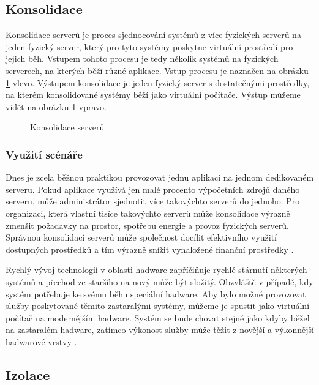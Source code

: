 \subsection{Konsolidace}
\label{consolidation}

Konsolidace serverů je proces sjednocování systémů z více fyzických serverů na jeden fyzický server, který pro tyto systémy poskytne virtuální prostředí pro jejich běh. Vstupem tohoto procesu je tedy několik systémů na fyzických serverech,
na kterých běží různé aplikace. Vstup procesu je naznačen na obrázku \ref{consolidation_img} vlevo. Výstupem konsolidace je jeden fyzický server s dostatečnými prostředky, na kterém konsolidované systémy běží jako virtuální počítače.
Výstup můžeme vidět na obrázku \ref{consolidation_img} vpravo.

\begin{figure}
    \centering    
    \caption{Konsolidace serverů}
    \label{consolidation_img}
\end{figure}

\subsubsection*{Využití scénáře}

Dnes je zcela běžnou praktikou provozovat jednu aplikaci na jednom dedikovaném serveru. Pokud aplikace využívá jen malé procento výpočetních zdrojů daného serveru, může administrátor sjednotit více takovýchto serverů
do jednoho. Pro organizaci, která vlastní tisíce takovýchto serverů může konsolidace výrazně zmenšit požadavky na prostor, spotřebu energie a provoz fyzických serverů. Správnou konsolidací serverů může společnost docílit
efektivního využití dostupných prostředků a tím výrazně snížit vynaložené finanční prostředky \cite{reasons}.

Rychlý vývoj technologií v oblasti hadware zapříčiňuje rychlé stárnutí některých systémů a přechod ze staršího na nový může být složitý. Obzvláště v případě, kdy systém potřebuje ke svému běhu speciální hadware.
Aby bylo možné provozovat služby poskytované těmito zastaralými systémy, můžeme je spustit jako virtuální počítač na modernějším hadware. Systém se bude chovat stejně jako kdyby běžel na zastaralém hadware, zatímco
výkonost služby může těžit z novější a výkonnější hadwarové vrstvy  \cite{reasons}.

\subsection{Izolace}

